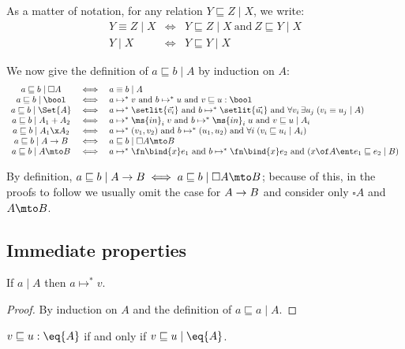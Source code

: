 \documentclass{article}
\renewcommand{\land}{~\text{and}~}
\newcommand{\ale}{\sqsubseteq}
\newcommand{\aeq}{\equiv}
\newcommand{\step}{\mapsto}
\newcommand{\steps}{\step^*}
\newcommand{\disc}[1]{\square{#1}}
\newcommand{\lr}[2]{#2\mathrel{|}#1}
\newcommand{\lrcx}[3]{#1 \ent \lr{#2}{#3}}
\begin{document}
As a matter of notation, for any relation $\lr{X}{Y \ale Z}$, we write:
\[\begin{array}{ccl}
  \lr{X}{Y \aeq Z} &\iff& \lr{X}{Y \ale Z} \land \lr{X}{Z \ale Y}\\
  \lr{X}{Y}     &\iff& \lr{X}{Y \ale Y}
\end{array}\]

We now give the definition of $\lr{A}{a \ale b}$ by induction on $A$:
\[\begin{array}{ccl}
  \lr{\disc{A}}{a \ale b} &\iff& \lr{A}{a \aeq b}\\
  \lr{\bool}{a \ale b} &\iff&
  a \steps v \land b \steps u \land v \ale u : \bool\\
  \lr{\Set{A}}{a \ale b} &\iff&
  a \steps \setlit{\vec{v_i}} \land b \steps \setlit{\vec{u_i}}
  \land \forall v_i\,\exists u_j\; (\lr{A}{v_i \aeq u_j})\\
  \lr{A_1 + A_2}{a \ale b} &\iff&
  a \steps \ms{in}_i\;v \land b \steps \ms{in}_i\;u \land \lr{A_i}{v \ale u}\\
  \lr{A_1 \x A_2}{a \ale b} &\iff&
  a \steps (v_1, v_2) \land b \steps (u_1, u_2)
  \land \forall i\; (\lr{A_i}{v_i \ale u_i})\\
  \lr{A \to B}{a \ale b} &\iff& \lr{\disc{A} \mto B}{a \ale b}\\
  \lr{A \mto B}{a \ale b} &\iff&
  a \steps \fn\bind{x} e_1 \land b \steps \fn\bind{x} e_2
  \land (\lrcx{x\of A}{B}{e_1 \ale e_2})
\end{array}\]

By definition, $\lr{A \uto B}{a \ale b} \iff \lr{\disc{A} \mto B}{a \ale b}$;
because of this, in the proofs to follow we usually omit the case for $A \to B$
and consider only $\disc{A}$ and $A \mto B$.


\subsection{Immediate properties}

\begin{theorem}[Termination]
  If $\lr{A}{a}$ then $a \steps v$.
\end{theorem}

\begin{proof}
  By induction on $A$ and the definition of $\lr{A}{a \ale a}$.
\end{proof}

\begin{theorem}
  \label{thm:agree-ineq}
  $v \ale u : \eq{A}$ if and only if $\lr{\eq{A}}{v \ale u}$.
\end{theorem}
\end{document}
